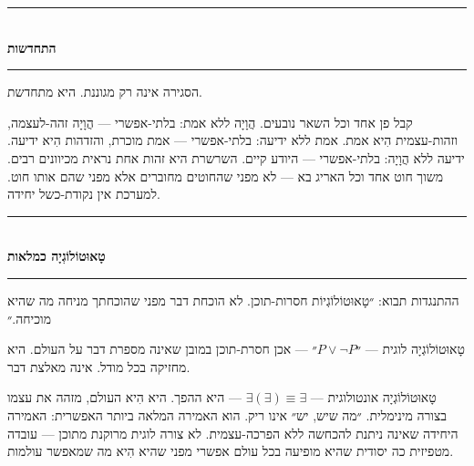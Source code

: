 \documentclass[10pt, openany, oneside]{book}
\renewcommand{\normalsize}{\fontsize{10}{13}\selectfont}
\begin{document}
\vspace{1.5em}


\begin{center}
    \rule{0.3\textwidth}{0.4pt}\\[0.5em]
    {\normalsize\bfseries\textsc{התחדשות}}\\[0.3em]
    \rule{0.3\textwidth}{0.4pt}
\end{center}

\vspace{1em}

\noindent הסגירה אינה רק מגוננת. היא מתחדשת.

קבל פן אחד וכל השאר נובעים. הֲוָיָה ללא אמת: בלתי-אפשרי — הֲוָיָה זהה-לעצמה, וזהות-עצמית הִיא אמת. אמת ללא ידיעה: בלתי-אפשרי — אמת מוכרת, והזדהות הִיא ידיעה. ידיעה ללא הֲוָיָה: בלתי-אפשרי — היודע קיים. השרשרת היא זהות אחת נראית מכיוונים רבים. משוך חוט אחד וכל האריג בא — לא מפני שהחוטים מחוברים אלא מפני שהם אותו חוט. למערכת אין נקודת-כשל יחידה.

\vspace{1em}

\begin{center}
    \rule{0.3\textwidth}{0.4pt}\\[0.5em]
    {\normalsize\bfseries\textsc{טָאוּטוֹלוֹגְיָה כמלאות}}\\[0.3em]
    \rule{0.3\textwidth}{0.4pt}
\end{center}

\vspace{1em}

\noindent ההתנגדות תבוא: ״טָאוּטוֹלוֹגְיוֹת חסרות-תוכן. לא הוכחת דבר מפני שהוכחתך מניחה מה שהיא מוכיחה.״

טָאוּטוֹלוֹגְיָה לוגית — ״$P \vee \neg P$״ — אכן חסרת-תוכן במובן שאינה מספרת דבר על העולם. היא מחזיקה בכל מודל. אינה מאלצת דבר.

טָאוּטוֹלוֹגְיָה אונטולוגית — $\exists(\exists) \equiv \exists$ — היא ההפך. היא הִיא העולם, מזהה את עצמו בצורה מינימלית. ״מה שיש, יש״ אינו ריק. הוא האמירה המלאה ביותר האפשרית: האמירה היחידה שאינה ניתנת להכחשה ללא הפרכה-עצמית. לא צורה לוגית מרוקנת מתוכן — עובדה מטפיזית כה יסודית שהיא מופיעה בכל עולם אפשרי מפני שהיא הִיא מה שמאפשר עולמות.

\vspace{1.5em}

\end{document}

